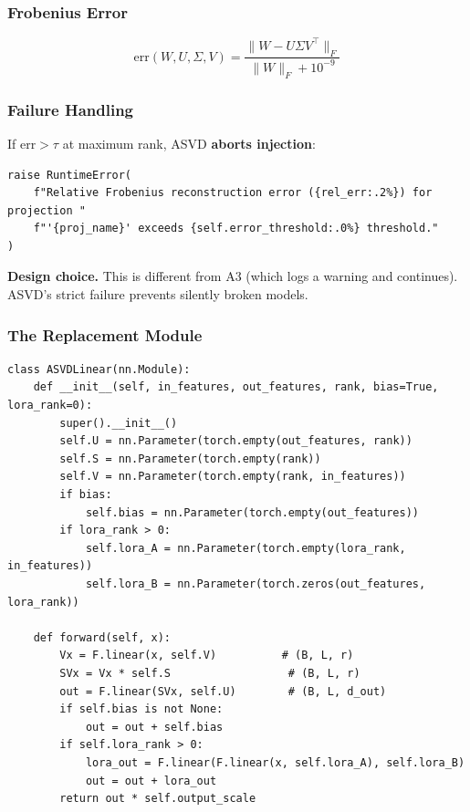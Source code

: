 \subsubsection{Frobenius Error}

\begin{equation}
\text{err}(W, U, \Sigma, V) = \frac{\|W - U \Sigma V^\top\|_F}{\|W\|_F + 10^{-9}}
\end{equation}

\subsubsection{Failure Handling}

If $\text{err} > \tau$ at maximum rank, ASVD \textbf{aborts injection}:

\begin{lstlisting}
raise RuntimeError(
    f"Relative Frobenius reconstruction error ({rel_err:.2%}) for projection "
    f"'{proj_name}' exceeds {self.error_threshold:.0%} threshold."
)
\end{lstlisting}

\textbf{Design choice.} This is different from A3 (which logs a warning and 
continues). ASVD's strict failure prevents silently broken models.

\subsubsection{The Replacement Module}

\begin{lstlisting}
class ASVDLinear(nn.Module):
    def __init__(self, in_features, out_features, rank, bias=True, lora_rank=0):
        super().__init__()
        self.U = nn.Parameter(torch.empty(out_features, rank))
        self.S = nn.Parameter(torch.empty(rank))
        self.V = nn.Parameter(torch.empty(rank, in_features))
        if bias:
            self.bias = nn.Parameter(torch.empty(out_features))
        if lora_rank > 0:
            self.lora_A = nn.Parameter(torch.empty(lora_rank, in_features))
            self.lora_B = nn.Parameter(torch.zeros(out_features, lora_rank))
    
    def forward(self, x):
        Vx = F.linear(x, self.V)          # (B, L, r)
        SVx = Vx * self.S                  # (B, L, r)
        out = F.linear(SVx, self.U)        # (B, L, d_out)
        if self.bias is not None:
            out = out + self.bias
        if self.lora_rank > 0:
            lora_out = F.linear(F.linear(x, self.lora_A), self.lora_B)
            out = out + lora_out
        return out * self.output_scale
\end{lstlisting}

